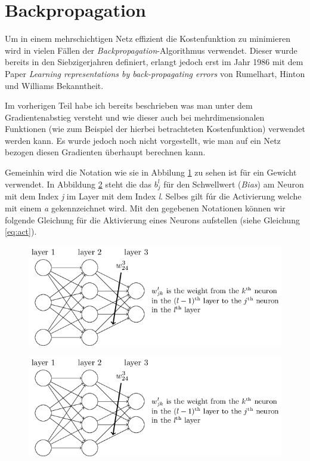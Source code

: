 \section{Backpropagation}

Um in einem mehrschichtigen Netz effizient die Kostenfunktion zu minimieren wird in vielen Fällen der \emph{Backpropagation}-Algorithmus verwendet. Dieser wurde bereits in den Siebzigerjahren definiert, erlangt jedoch erst im Jahr 1986 mit dem Paper \emph{Learning representations by back-propagating errors} von Rumelhart, Hinton und Williams Bekanntheit. 

Im vorherigen Teil habe ich bereits beschrieben was man unter dem Gradientenabstieg versteht und wie dieser auch bei mehrdimensionalen Funktionen (wie zum Beispiel der hierbei betrachteten Kostenfunktion) verwendet werden kann. Es wurde jedoch noch nicht vorgestellt, wie man auf ein Netz bezogen diesen Gradienten überhaupt berechnen kann. 

Gemeinhin wird die Notation wie sie in Abbilung \ref{fig:weight_not} zu sehen ist für ein Gewicht verwendet. In Abbildung \ref{fig:biasAct_not} steht die das $b^l_j$ für den Schwellwert (\emph{Bias}) am Neuron mit dem Index \emph{j} im Layer mit dem Index \emph{l}. Selbes gilt fúr die Activierung welche mit einem \emph{a} gekennzeichnet wird. Mit den gegebenen Notationen können wir folgende Gleichung für die Aktivierung eines Neurons aufstellen (siehe Gleichung \ref{eq:act}). 

\begin{figure}[!htb]
	\centering
	\includegraphics[width=\linewidth]{img/weight_notation}
	\label{fig:weight_not}
\end{figure}

\begin{figure}[!htb]
	\centering
	\includegraphics[width=\linewidth]{img/weight_notation}
	\label{fig:biasAct_not}
\end{figure}

